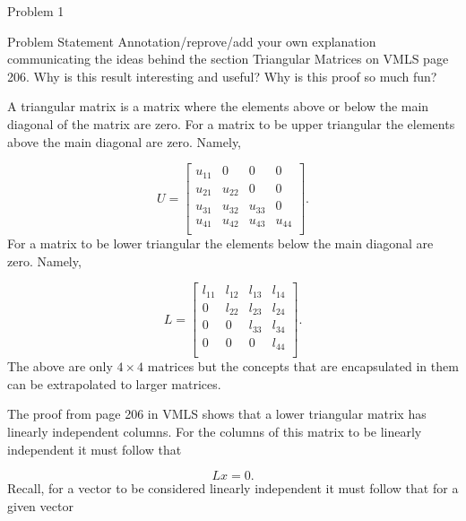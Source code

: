 \begin{problem}{Problem 1}
    \begin{statement}{Problem Statement}
        Annotation/reprove/add your own explanation communicating the ideas behind the section Triangular Matrices on VMLS page 206. Why is this result interesting and useful? Why is this proof so much fun?        
    \end{statement}

    \begin{Highlight}[Solution]
        A triangular matrix is a matrix where the elements above or below the main diagonal of the matrix are zero. For a matrix to be upper triangular the elements above the main diagonal are zero. Namely,

        \begin{equation*}
            U =
            \begin{bmatrix}
                u_{11} & 0 & 0 & 0 \\
                u_{21} & u_{22} & 0 & 0 \\
                u_{31} & u_{32} & u_{33} & 0 \\
                u_{41} & u_{42} & u_{43} & u_{44} \\
            \end{bmatrix}.
        \end{equation*}
        For a matrix to be lower triangular the elements below the main diagonal are zero. Namely,

        \begin{equation*}
            L = 
            \begin{bmatrix}
                l_{11} & l_{12} & l_{13} & l_{14} \\
                0 & l_{22} & l_{23} & l_{24} \\
                0 & 0 & l_{33} & l_{34} \\
                0 & 0 & 0 & l_{44} \\
            \end{bmatrix}.
        \end{equation*}
        The above are only $4 \times 4$ matrices but the concepts that are encapsulated in them can be extrapolated to larger matrices.

        The proof from page 206 in VMLS shows that a lower triangular matrix has linearly independent columns. For the columns of this matrix to be linearly independent it must follow that

        \setcounter{equation}{0}
        \begin{equation}
            Lx = 0.
        \end{equation}
        Recall, for a vector to be considered linearly independent it must follow that for a given vector


\end{Highlight}
\end{problem}
